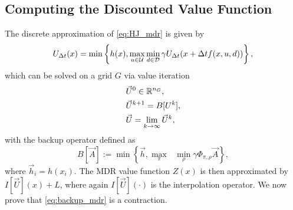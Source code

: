 %
%






\subsection{Computing the Discounted Value Function}
The discrete approximation of \eqref{eq:HJ_mdr} is given by
%
\begin{equation}\label{eq:U_approx}
    U_{\Delta t} (x) = \min\left\{h(x), \max_{u\in\mathcal{U}} \min_{ d\in\mathcal{D}}  \gamma U_{\Delta t}(x+\Delta tf(x,u,d))\right\} ,
\end{equation}%
\noindent which can be solved on a grid $G$ via value iteration 
%
\begin{subequations} \label{eq:val_iter_backup}
\begin{align}
&\vec{U}^{0} \in \mathbb{R}^{n_G} ,\\
&\vec{U}^{k+1} = B[U^k] ,\\
&\vec{U} = \lim_{k\rightarrow \infty} \vec{U}^{k} ,
\end{align}
\end{subequations}%
\noindent with the backup operator defined as
%
\begin{equation} \label{eq:backup_mdr}
B[\vec{A}] := \min\left\{ \vec{h}, \underset{\pi}{\max}\text{ }\underset{ \rho}{\min} \gamma \Phi_{\pi, \rho} \vec{A} \right \}
,
\end{equation}%
\noindent where $\vec{h}_i = h(x_i)$. The MDR value function $Z(x)$ is then approximated by $I[\vec{U}](x)+L$, where again $I[\vec{U}](\cdot)$ is the interpolation operator. We now prove that \eqref{eq:backup_mdr} is a contraction.

